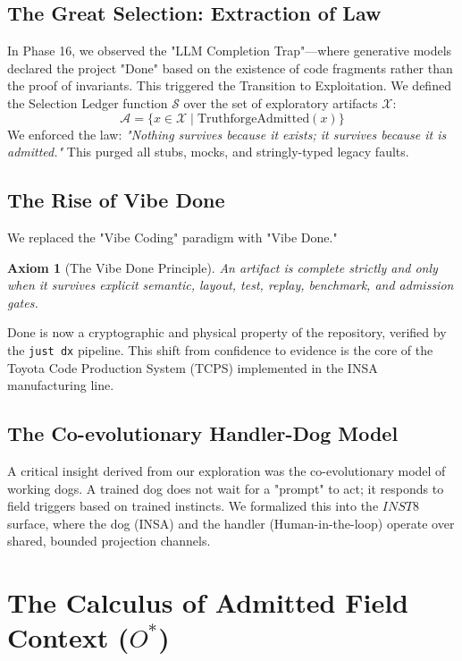 \documentclass[12pt,a4paper,oneside]{book}
\newtheorem{axiom}{Axiom}[chapter]
\begin{document}
\section{The Great Selection: Extraction of Law}
In Phase 16, we observed the "LLM Completion Trap"---where generative models declared the project "Done" based on the existence of code fragments rather than the proof of invariants. This triggered the Transition to Exploitation. We defined the Selection Ledger function $\mathcal{S}$ over the set of exploratory artifacts $\mathcal{X}$:
\begin{equation}
\mathcal{A} = \{ x \in \mathcal{X} \mid \text{TruthforgeAdmitted}(x) \}
\end{equation}
We enforced the law: \textit{"Nothing survives because it exists; it survives because it is admitted."} This purged all stubs, mocks, and stringly-typed legacy faults.

\section{The Rise of Vibe Done}
We replaced the "Vibe Coding" paradigm with "Vibe Done."
\begin{axiom}[The Vibe Done Principle]
An artifact is complete strictly and only when it survives explicit semantic, layout, test, replay, benchmark, and admission gates.
\end{axiom}
Done is now a cryptographic and physical property of the repository, verified by the \texttt{just dx} pipeline. This shift from confidence to evidence is the core of the Toyota Code Production System (TCPS) implemented in the INSA manufacturing line.

\section{The Co-evolutionary Handler-Dog Model}
A critical insight derived from our exploration was the co-evolutionary model of working dogs. A trained dog does not wait for a "prompt" to act; it responds to field triggers based on trained instincts. We formalized this into the $INST8$ surface, where the dog (INSA) and the handler (Human-in-the-loop) operate over shared, bounded projection channels.

\chapter{The Calculus of Admitted Field Context ($O^*$)}
\end{document}
